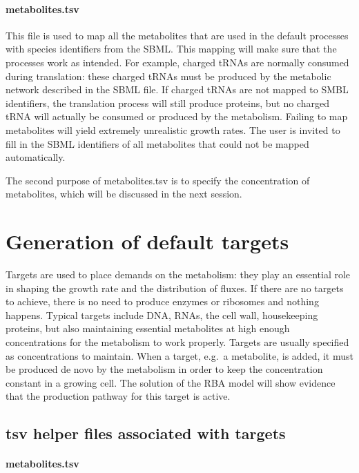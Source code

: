 \paragraph{metabolites.tsv}
This file is used to map all the metabolites
that are used in the default processes with species identifiers from the SBML.
This mapping will make sure that the processes work as intended.
For example, charged tRNAs are normally consumed during translation:
these charged tRNAs must be produced by the metabolic network described in the SBML file.
If charged tRNAs are not mapped to SMBL identifiers,
the translation process will still produce proteins,
but no charged tRNA will actually be consumed or produced by the metabolism.
Failing to map metabolites will yield extremely unrealistic growth rates.
The user is invited to fill in the SBML identifiers of all metabolites that
could not be mapped automatically.

The second purpose of metabolites.tsv is to specify the concentration of metabolites,
which will be discussed in the next session.

\section{Generation of default targets}

Targets are used to place demands on the metabolism:
they play an essential role in shaping the growth rate and the distribution of fluxes.
If there are no targets to achieve, there is no need to produce enzymes or ribosomes
and nothing happens.
Typical targets include DNA, RNAs, the cell wall, housekeeping proteins,
but also maintaining essential metabolites at high enough concentrations
for the metabolism to work properly.
Targets are usually specified as concentrations to maintain.
When a target, e.g.\ a metabolite, is added, it must be produced de novo
by the metabolism in order to keep the concentration constant in a growing cell.
The solution of the RBA model will show evidence that the production pathway
for this target is active.

\subsection{tsv helper files associated with targets}

\paragraph{metabolites.tsv}

